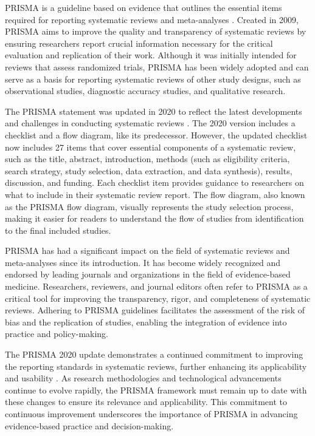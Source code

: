 \documentclass{article}
\begin{document}
PRISMA is a guideline based on evidence that outlines the essential items required for reporting systematic reviews and meta-analyses \cite{moher2009preferred}. Created in 2009, PRISMA aims to improve the quality and transparency of systematic reviews by ensuring researchers report crucial information necessary for the critical evaluation and replication of their work. Although it was initially intended for reviews that assess randomized trials, PRISMA has been widely adopted and can serve as a basis for reporting systematic reviews of other study designs, such as observational studies, diagnostic accuracy studies, and qualitative research.

The PRISMA statement was updated in 2020 to reflect the latest developments and challenges in conducting systematic reviews \cite{page2021prisma}. The 2020 version includes a checklist and a flow diagram, like its predecessor. However, the updated checklist now includes 27 items that cover essential components of a systematic review, such as the title, abstract, introduction, methods (such as eligibility criteria, search strategy, study selection, data extraction, and data synthesis), results, discussion, and funding. Each checklist item provides guidance to researchers on what to include in their systematic review report. The flow diagram, also known as the PRISMA flow diagram, visually represents the study selection process, making it easier for readers to understand the flow of studies from identification to the final included studies.

PRISMA has had a significant impact on the field of systematic reviews and meta-analyses since its introduction. It has become widely recognized and endorsed by leading journals and organizations in the field of evidence-based medicine. Researchers, reviewers, and journal editors often refer to PRISMA as a critical tool for improving the transparency, rigor, and completeness of systematic reviews. Adhering to PRISMA guidelines facilitates the assessment of the risk of bias and the replication of studies, enabling the integration of evidence into practice and policy-making.

The PRISMA 2020 update demonstrates a continued commitment to improving the reporting standards in systematic reviews, further enhancing its applicability and usability \cite{page2021prisma}. As research methodologies and technological advancements continue to evolve rapidly, the PRISMA framework must remain up to date with these changes to ensure its relevance and applicability. This commitment to continuous improvement underscores the importance of PRISMA in advancing evidence-based practice and decision-making.
\end{document}
